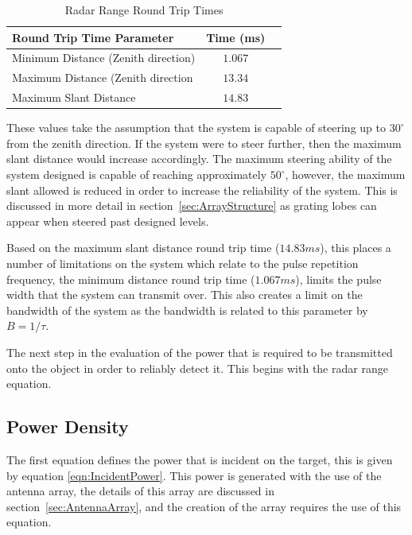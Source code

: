 \documentclass[11pt]{witseiepaper}
\begin{document}
\begin{table}[htb]
    \caption{Radar Range Round Trip Times}
    \label{tab:RadarRangeValues}
    \begin{center}
        \begin{tabular}{p{70mm}cp{70mm}}
            \hline 
            Round Trip Time Parameter & Time (ms) \\
            \hline
            Minimum Distance (Zenith direction) & $1.067$ \\
            Maximum Distance  (Zenith direction & $13.34$ \\
            Maximum Slant Distance & $14.83$ \\
            \hline
        \end{tabular}
    \end{center}
\end{table}
These values take the assumption that the system is capable of steering up to $30^{\circ}$ from the zenith direction. If the system were to steer further, then the maximum slant distance would increase accordingly. The maximum steering ability of the system designed is capable of reaching approximately $50^{\circ}$, however, the maximum slant allowed is reduced in order to increase the reliability of the system. This is discussed in more detail in section~\ref{sec:ArrayStructure} as grating lobes can appear when steered past designed levels.

Based on the maximum slant distance round trip time ($14.83 ms$), this places a number of limitations on the system which relate to the pulse repetition frequency, the minimum distance round trip time ($1.067 ms$), limits the pulse width that the system can transmit over. This also creates a limit on the bandwidth of the system as the bandwidth is related to this parameter by $B = 1/ \tau$.


The next step in the evaluation of the power that is required to be transmitted onto the object in order to reliably detect it. This begins with the radar range equation.

\subsection{Power Density} \label{sec:PowerDensity}

The first equation defines the power that is incident on the target, this is given by equation \ref{eqn:IncidentPower}. This power is generated with the use of the antenna array, the details of this array are discussed in section~\ref{sec:AntennaArray}, and the creation of the array requires the use of this equation. 
\end{document}
